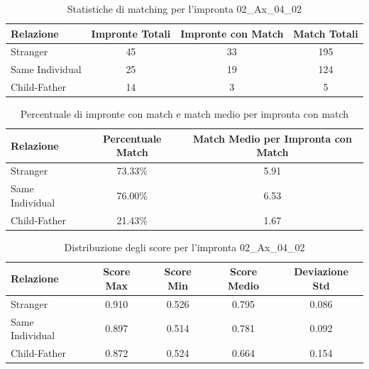 \begin{table}[htbp]
\centering
\caption{Statistiche di matching per l'impronta 02\_Ax\_04\_02}
\label{tab:results_02_Ax_04_02}
\begin{tabular}{|l|c|c|c|}
\hline
\textbf{Relazione} & \textbf{Impronte Totali} & \textbf{Impronte con Match} & \textbf{Match Totali} \\
\hline
Stranger & 45 & 33 & 195 \\
\hline
Same Individual & 25 & 19 & 124 \\
\hline
Child-Father & 14 & 3 & 5 \\
\hline
\end{tabular}
\end{table}


\begin{table}[htbp]
\centering
\caption{Percentuale di impronte con match e match medio per impronta con match}
\label{tab:match_percentage_02_Ax_04_02}
\begin{tabular}{|l|c|c|}
\hline
\textbf{Relazione} & \textbf{Percentuale Match} & \textbf{Match Medio per Impronta con Match} \\
\hline
Stranger & 73.33\% & 5.91 \\
\hline
Same Individual & 76.00\% & 6.53 \\
\hline
Child-Father & 21.43\% & 1.67 \\
\hline
\end{tabular}
\end{table}


\begin{table}[htbp]
\centering
\caption{Distribuzione degli score per l'impronta 02\_Ax\_04\_02}
\label{tab:scores_02_Ax_04_02}
\begin{tabular}{|l|c|c|c|c|}
\hline
\textbf{Relazione} & \textbf{Score Max} & \textbf{Score Min} & \textbf{Score Medio} & \textbf{Deviazione Std} \\
\hline
Stranger & 0.910 & 0.526 & 0.795 & 0.086 \\
\hline
Same Individual & 0.897 & 0.514 & 0.781 & 0.092 \\
\hline
Child-Father & 0.872 & 0.524 & 0.664 & 0.154 \\
\hline
\end{tabular}
\end{table}

